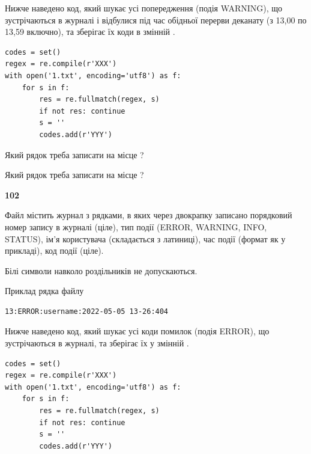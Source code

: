 Нижче наведено код, який шукає усі попередження (подія WARNING), що зустрі\-ча\-ються в журналі і відбулися під час обідньої перерви деканату (з 13,00 по 13,59 включно), та зберігає їх коди в змінній .



\begin{verbatim}
codes = set()
regex = re.compile(r'XXX')
with open('1.txt', encoding='utf8') as f:
    for s in f:
        res = re.fullmatch(regex, s)
        if not res: continue
        s = ''
        codes.add(r'YYY')
\end{verbatim}







Який рядок треба записати на місце  ?\par
\vspace{5mm}


Який рядок треба записати на місце  ?\par


\newpage

{\begin {center}\textbf{ 102}\end {center}}\par
Файл  містить журнал з рядками, в яких через двокрапку записано поряд\-ко\-вий номер запису в журналі (ціле), тип події (ERROR, WARNING, INFO, STATUS), ім'я користувача (складається з латиниці), час події (фор\-мат як у прикладі), код події (ціле).

Білі символи навколо роздільників не допускаються.

Приклад рядка файлу



\begin{verbatim}
13:ERROR:username:2022-05-05 13-26:404
\end{verbatim}


Нижче наведено код, який шукає усі коди помилок (подія ERROR), що зустріча\-ють\-ся в журналі, та зберігає їх у змінній .



\begin{verbatim}
codes = set()
regex = re.compile(r'XXX')
with open('1.txt', encoding='utf8') as f:
    for s in f:
        res = re.fullmatch(regex, s)
        if not res: continue
        s = ''
        codes.add(r'YYY')
\end{verbatim}





